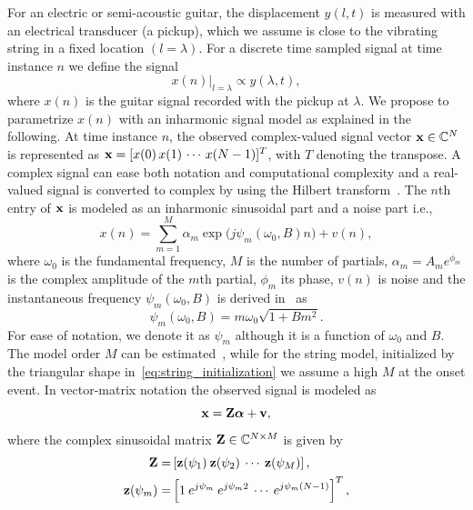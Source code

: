 \documentclass{article}
\begin{document}
For an electric or semi-acoustic guitar, the displacement $y(l,t)$ is measured with an electrical transducer (a pickup), which we assume is close to the vibrating string in a fixed location $(l=\lambda)$. For a discrete time sampled signal at time instance $n$ we define the signal
\begin{equation}
     x(n)  \vert_{l=\lambda} \propto y(\lambda, t),
\end{equation}   
where $x(n)$ is the guitar signal recorded with the pickup at $\lambda$. We propose to parametrize $x(n)$ with an inharmonic signal model as explained in the following. 
%
 At time instance $n$, the observed complex-valued signal vector $\mathbf x \in \mathbb{C}^N$ is represented as $\mathbf x = [x(0) \, x(1) \, \cdots \, x(N-1)]^T$, with $T$ denoting the transpose. %
A complex signal can ease both notation and computational complexity and a real-valued signal is converted to complex by using the Hilbert transform~\cite{LawrenceMarple1999}. The $n$th entry of $\mathbf x$ is modeled as an inharmonic sinusoidal part and a noise part i.e.,  
\begin{equation}\label{eq:sigmod1}
  x(n)\! =  \!\sum\limits_{m=1}^{M}\!\! \alpha_{m} \exp\big({j\psi_m(\omega_0,B) n}\big)+v(n), 
\end{equation}
where $\omega_0$ is the fundamental frequency, $M$ is the number of partials, $\alpha_{m}\!\! =\! A_me^{\phi_m}$ is the complex amplitude of the $m$th partial, $\phi_m$ its phase, $v(n)$ is noise and the instantaneous frequency  $\psi_m(\omega_0,B)$ is derived in~\cite{fletcher:piano_model} as
\begin{equation}
  \psi_m(\omega_0,B) = m \omega_0 \sqrt{1+B m^2}. 
\end{equation}
For ease of notation, we denote it as $\psi_m$ although it is a function of $\omega_0$ and $B$. The model order $M$ can be estimated~\cite{nielsen2017fast,multipitch}, while for the string model, initialized by the triangular shape in~\eqref{eq:string_initialization} we assume a high $M$ at the onset event. In vector-matrix notation the observed signal is modeled as
\begin{equation}\label{eq:xZa}
  \mathbf x = \mathbf{Z} \text{\boldmath$\alpha$} + \mathbf v,
\end{equation} 
where the complex sinusoidal matrix $\mathbf{Z} \in \mathbb{C}^{N\times M}$ is given by
\begin{align}
  \mathbf{Z} =& \left[ \mathbf z(\psi_1) \: \mathbf z(\psi_2) \: \cdots \: \mathbf z(\psi_M)\right], \\
  \mathbf z(\psi_m) =& \left[ 1 \: e^{j\psi_m} \: e^{j\psi_m2} \: \cdots \: e^{j\psi_m(N-1)} \right]^{T},
\end{align}
\end{document}
